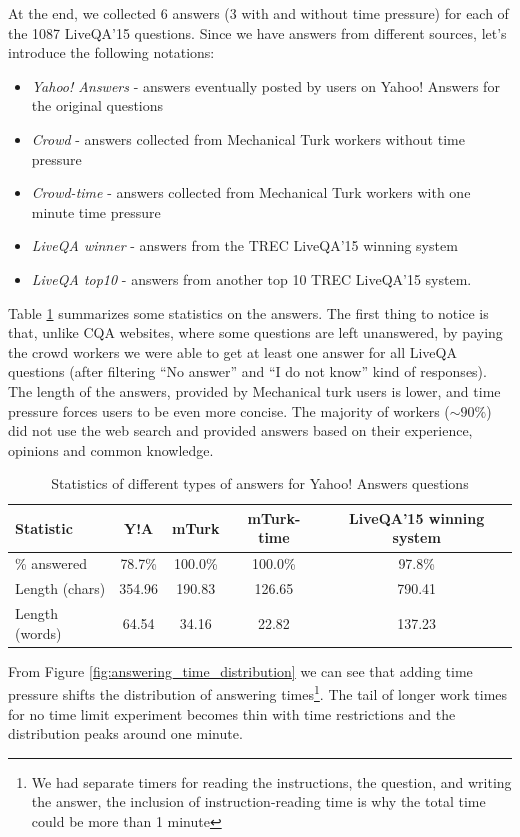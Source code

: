 At the end, we collected 6 answers (3 with and without time pressure) for each of the 1087 LiveQA'15 questions.
Since we have answers from different sources, let's introduce the following notations:
\begin{itemize}
	\item \textit{Yahoo! Answers} - answers eventually posted by users on Yahoo! Answers for the original questions
	\item \textit{Crowd} - answers collected from Mechanical Turk workers without time pressure
	\item \textit{Crowd-time} - answers collected from Mechanical Turk workers with one minute time pressure
	\item \textit{LiveQA winner} - answers from the TREC LiveQA'15 winning system
	\item \textit{LiveQA top10} - answers from another top 10 TREC LiveQA'15 system.
\end{itemize}

Table \ref{table:crowdsourcing:answer_stats} summarizes some statistics on the answers.
The first thing to notice is that, unlike CQA websites, where some questions are left unanswered, by paying the crowd workers we were able to get at least one answer for all LiveQA questions (after filtering ``No answer'' and ``I do not know'' kind of responses).
The length of the answers, provided by Mechanical turk users is lower, and time pressure forces users to be even more concise.
The majority of workers ($\sim90 \%$) did not use the web search and provided answers based on their experience, opinions and common knowledge.

\begin{table}[ht]
\centering
\begin{tabular}{| p{3cm} | c | c | c | c |}
\hline
Statistic & Y!A & mTurk & mTurk-time & LiveQA'15 winning system\\
\hline
\% answered & 78.7\% & 100.0\% & 100.0\% & 97.8\% \\
Length (chars) & 354.96 & 190.83 & 126.65 & 790.41 \\
Length (words) & 64.54 & 34.16 & 22.82 & 137.23 \\
\hline
\end{tabular}
\caption{Statistics of different types of answers for Yahoo! Answers questions}
\label{table:crowdsourcing:answer_stats}
\end{table}

From Figure \ref{fig:answering_time_distribution} we can see that adding time pressure shifts the distribution of answering times\footnote{We had separate timers for reading the instructions, the question, and writing the answer, the inclusion of instruction-reading time is why the total time could be more than 1 minute}.
The tail of longer work times for no time limit experiment becomes thin with time restrictions and the distribution peaks around one minute.

